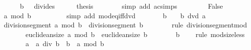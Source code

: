 \begin{isabellebody}
\isanewline
\ \ \ \ \isamarkupfalse%
\ {\isacartoucheopen}b\ {\isasymnoteq}\ {}{\isacartoucheclose}\ divides\isanewline
\ \ \ \ \isamarkupfalse%
\ thesis\isanewline
\ \ \ \ \ \ \isamarkupfalse%
\ {\isacharparenleft}{\kern0pt}simp\ add{\isacharcolon}{\kern0pt}\ ac{\isacharunderscore}{\kern0pt}simps{\isacharparenright}{\kern0pt}\isanewline
\ \ \isamarkupfalse%
\isanewline
\ \ \ \ \isamarkupfalse%
\ False\isanewline
\ \ \ \ \isamarkupfalse%
\ \isamarkupfalse%
\ {\isachardoublequoteopen}a\ mod\ b\ {\isasymnoteq}\ {}{\isachardoublequoteclose}\isanewline
\ \ \ \ \ \ \isamarkupfalse%
\ {\isacharparenleft}{\kern0pt}simp\ add{\isacharcolon}{\kern0pt}\ mod{\isacharunderscore}{\kern0pt}eq{\isacharunderscore}{\kern0pt}{}{\isacharunderscore}{\kern0pt}iff{\isacharunderscore}{\kern0pt}dvd{\isacharparenright}{\kern0pt}\isanewline
\ \ \ \ \isamarkupfalse%
\ \isamarkupfalse%
\ {\isacartoucheopen}b\ {\isasymnoteq}\ {}{\isacartoucheclose}\ {\isacartoucheopen}{\isasymnot}\ b\ dvd\ a{\isacartoucheclose}\ \isamarkupfalse%
\ {\isachardoublequoteopen}division{\isacharunderscore}{\kern0pt}segment\ {\isacharparenleft}{\kern0pt}a\ mod\ b{\isacharparenright}{\kern0pt}\ {\isacharequal}{\kern0pt}\ division{\isacharunderscore}{\kern0pt}segment\ b{\isachardoublequoteclose}\isanewline
\ \ \ \ \ \ \isamarkupfalse%
\ {\isacharparenleft}{\kern0pt}rule\ division{\isacharunderscore}{\kern0pt}segment{\isacharunderscore}{\kern0pt}mod{\isacharparenright}{\kern0pt}\isanewline
\ \ \ \ \isamarkupfalse%
\ \isamarkupfalse%
\ {\isachardoublequoteopen}euclidean{\isacharunderscore}{\kern0pt}size\ {\isacharparenleft}{\kern0pt}a\ mod\ b{\isacharparenright}{\kern0pt}\ {\isacharless}{\kern0pt}\ euclidean{\isacharunderscore}{\kern0pt}size\ b{\isachardoublequoteclose}\isanewline
\ \ \ \ \ \ \isamarkupfalse%
\ {\isacartoucheopen}b\ {\isasymnoteq}\ {}{\isacartoucheclose}\ \isamarkupfalse%
\ {\isacharparenleft}{\kern0pt}rule\ mod{\isacharunderscore}{\kern0pt}size{\isacharunderscore}{\kern0pt}less{\isacharparenright}{\kern0pt}\isanewline
\ \ \ \ \isamarkupfalse%
\ \isamarkupfalse%
\ {\isachardoublequoteopen}a\ {\isacharequal}{\kern0pt}\ a\ div\ b\ {\isacharasterisk}{\kern0pt}\ b\ {\isacharplus}{\kern0pt}\ a\ mod\ b{\isachardoublequoteclose}\isanewline

\end{isabellebody}
